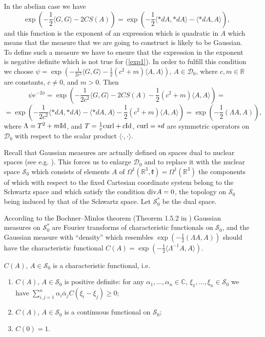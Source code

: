 \documentclass{amsart}
\begin{document}
In the abelian case we have 
\begin{equation}\label{exp1}
\exp(-\frac12\langle G,G\rangle -2CS(A))=\exp(-\frac12\langle *dA,*dA\rangle -\langle *dA,A\rangle ), 	
\end{equation}
and this function is the exponent of an expression which is quadratic in $A$ which means that the measure that we are going to construct is likely to be Gaussian. To define such a measure we have to ensure that the expression in the exponent is negative definite which is not true for (\ref{exp1}). In order to fulfill this condition we choose $\psi=\exp(-\frac1{2c^2}\langle G,G\rangle -\frac12(c^2+m)\langle A,A\rangle )$, $A\in \mathcal{D}_0$, where $c,m\in \mathbb{R}$ are constants, $c\neq 0$, and $m>0$. Then
\begin{equation}\label{exp2}
\psi e^{-2\phi}=\exp(-\frac1{2c^2}\langle G,G\rangle -2CS(A)-\frac12(c^2+m)\langle A,A\rangle )=	
\end{equation}
$$
=\exp(-\frac1{2c^2}\langle *dA,*dA\rangle -\langle *dA,A\rangle -\frac12(c^2+m)\langle A,A\rangle )=\exp(-\frac12(\Lambda A,A)),
$$
where $\Lambda=T^2+m{\rm Id}$, and $T=\frac1c{\rm curl}+c{\rm Id}$, ${\rm curl}=*d$ are symmetric operators on $\mathcal{D}_0$ with respect to the scalar product $\langle \cdot,\cdot\rangle $.

Recall that Gaussian measures are actually defined on spaces dual to nuclear spaces (see e.g. \cite{Ob}). This forces us to enlarge $\mathcal{D}_0$ and to replace it with the nuclear space $\mathcal{S}_0$ which consists of elements $A$ of $\Omega^1(\mathbb{R}^3,\mathfrak{k})=\Omega^1(\mathbb{R}^3)$ the components of which with respect to the fixed Cartesian coordinate system belong to the Schwartz space and which satisfy the condition ${\rm div}A=0$, the topology on $\mathcal{S}_0$ being induced by that of the Schwartz space. Let $\mathcal{S}_0^*$ be the dual space. 

According to the Bochner--Minlos theorem (Theorem 1.5.2 in \cite{Ob}) Gaussian measures on $\mathcal{S}_0^*$ are Fourier transforms of characteristic functionals on $\mathcal{S}_0$, and the Gaussian measure with ``density'' which resembles $\exp(-\frac12(\Lambda A,A))$ should have the characteristic functional $C(A)=\exp(-\frac12\langle \Lambda^{-1} A,A\rangle )$. 


\begin{lemma}\label{charf}
$C(A)$, $A\in \mathcal{S}_0$ is a characteristic functional, i.e. 
\begin{enumerate}
\item
$C(A)$, $A\in \mathcal{S}_0$ is positive definite: for any $\alpha_1,\ldots, \alpha_n\in \mathbb{C}$, $\xi_1,\ldots, \xi_n\in \mathcal{S}_0$ we have $\sum_{i,j=1}^n\alpha_i\bar{\alpha}_jC(\xi_i-\xi_j)\geq 0$;
\item
$C(A)$, $A\in \mathcal{S}_0$ is a continuous functional on $\mathcal{S}_0$; 
\item
$C(0)=1$.
\end{enumerate}
\end{lemma} 
\end{document}

